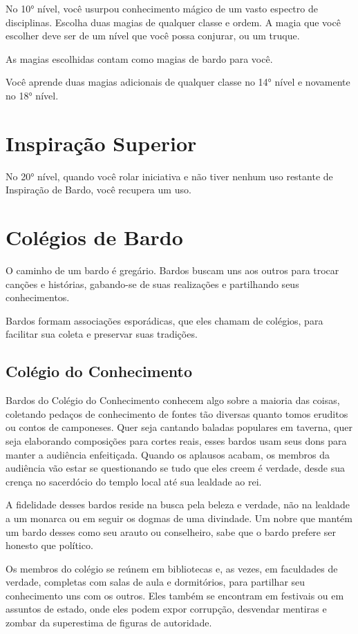 \documentclass{RPG_Adventure}[2021/10/20]
\begin{document}
\begin{multicols}{2}
No 10° nível, você usurpou conhecimento mágico de um vasto espectro de
disciplinas. Escolha duas magias de qualquer classe e ordem. A magia que você
escolher deve ser de um nível que você possa conjurar, ou um truque.

As magias escolhidas contam como magias de bardo para você.

Você aprende duas magias adicionais de qualquer classe no 14° nível e novamente
no 18° nível.

\section*{Inspiração Superior}%

No 20° nível, quando você rolar iniciativa e não tiver nenhum uso restante de
Inspiração de Bardo, você recupera um uso.

\section*{Colégios de Bardo}%

O caminho de um bardo é gregário. Bardos buscam uns aos outros para trocar
canções e histórias, gabando-se de suas realizações e partilhando seus
conhecimentos.

Bardos formam associações esporádicas, que eles chamam de colégios, para
facilitar sua coleta e preservar suas tradições.

\subsection*{Colégio do Conhecimento}%

Bardos do Colégio do Conhecimento conhecem algo sobre a maioria das coisas,
coletando pedaços de conhecimento de fontes tão diversas quanto tomos eruditos
ou contos de camponeses. Quer seja cantando baladas populares em taverna, quer
seja elaborando composições para cortes reais, esses bardos usam seus dons para
manter a audiência enfeitiçada. Quando os aplausos acabam, os membros da
audiência vão estar se questionando se tudo que eles creem é verdade, desde sua
crença no sacerdócio do templo local até sua lealdade ao rei.

A fidelidade desses bardos reside na busca pela beleza e verdade, não na
lealdade a um monarca ou em seguir os dogmas de uma divindade. Um nobre que
mantém um bardo desses como seu arauto ou conselheiro, sabe que o bardo prefere
ser honesto que político.

Os membros do colégio se reúnem em bibliotecas e, as vezes, em faculdades de
verdade, completas com salas de aula e dormitórios, para partilhar seu
conhecimento uns com os outros. Eles também se encontram em festivais ou em
assuntos de estado, onde eles podem expor corrupção, desvendar mentiras e zombar
da superestima de figuras de autoridade.


\end{multicols}
\end{document}
